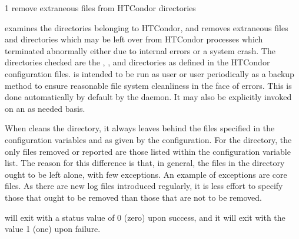 \begin{ManPage}{\label{man-condor-preen}}{1}
{remove extraneous files from HTCondor directories}
\Synopsis {}


\Description 

 examines the directories belonging to HTCondor, 
and removes extraneous files and directories which may be left over from
HTCondor processes which terminated abnormally either due to internal errors or
a system crash. The directories checked are 
the , , and 
directories as defined in the HTCondor configuration files.  is
intended to be run as user  or user 
periodically as a backup
method to ensure reasonable file system cleanliness in the face of
errors. This is done automatically by default by the  daemon. 
It may also be explicitly invoked on an as needed basis.

When  cleans the  directory, it always leaves
behind the files specified in the configuration variables
 and  as given by the configuration.
For the  directory, the only files removed or reported are those
listed within the configuration variable  list.
The reason for this difference is that, in general,
the files in the  directory ought to be left alone,
with few exceptions.
An example of exceptions are core files.
As there are new log files introduced regularly,
it is less effort to specify those that ought to be removed
than those that are not to be removed.

\begin{Options}





\end{Options}

\ExitStatus

 will exit with a status value of 0 (zero) upon success,
and it will exit with the value 1 (one) upon failure.

\end{ManPage}
